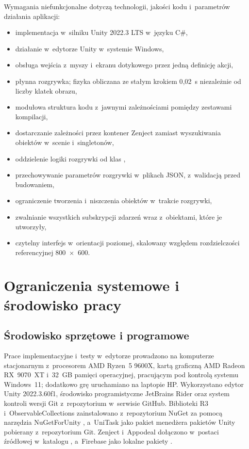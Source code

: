 Wymagania niefunkcjonalne dotyczą technologii, jakości kodu i~parametrów działania
aplikacji:
\begin{itemize}[leftmargin=1.9cm, itemsep=1pt]
  \item implementacja w~silniku Unity 2022.3 LTS w~języku C\#,
  \item działanie w~edytorze Unity w~systemie Windows,
  \item obsługa wejścia z~myszy i~ekranu dotykowego przez jedną definicję akcji,
  \item płynna rozgrywka; fizyka obliczana ze stałym krokiem 0{,}02~s niezależnie od
        liczby klatek obrazu,
  \item modułowa struktura kodu z~jawnymi zależnościami pomiędzy zestawami kompilacji,
  \item dostarczanie zależności przez kontener Zenject zamiast wyszukiwania obiektów
        w~scenie i~singletonów,
  \item oddzielenie logiki rozgrywki od klas ,
  \item przechowywanie parametrów rozgrywki w~plikach JSON, z~walidacją przed budowaniem,
  \item ograniczenie tworzenia i~niszczenia obiektów w~trakcie rozgrywki,
  \item zwalnianie wszystkich subskrypcji zdarzeń wraz z~obiektami, które je utworzyły,
  \item czytelny interfejs w~orientacji poziomej, skalowany względem rozdzielczości
        referencyjnej 800~$\times$~600.
\end{itemize}

\section{Ograniczenia systemowe i środowisko pracy}

\subsection{Środowisko sprzętowe i programowe}

Prace implementacyjne i~testy w~edytorze prowadzono na komputerze stacjonarnym
z~procesorem AMD Ryzen~5 9600X, kartą graficzną AMD Radeon RX~9070~XT i~32~GB pamięci
operacyjnej, pracującym pod kontrolą systemu Windows~11; dodatkowo grę uruchamiano na
laptopie HP. Wykorzystano edytor Unity 2022.3.60f1, środowisko programistyczne JetBrains Rider oraz system kontroli wersji Git z~repozytorium
w~serwisie GitHub. Biblioteki R3 i~ObservableCollections zainstalowano z~repozytorium
NuGet za pomocą narzędzia NuGetForUnity \cite{nugetforunity}, a~UniTask jako pakiet
menedżera pakietów Unity pobierany z~repozytorium Git. Zenject i~Appodeal dołączono
w~postaci źródłowej w~katalogu , a~Firebase jako lokalne pakiety
.


